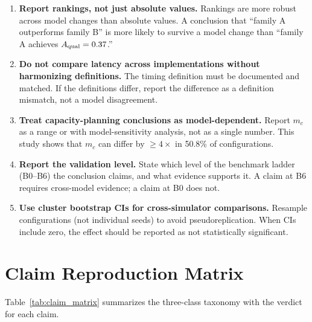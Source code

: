 \documentclass{ams-journal}
\newcommand{\Aqual}{A_{\rm qual}}
\begin{document}
\begin{enumerate}[leftmargin=2em]
\item \textbf{Report rankings, not just absolute values.} Rankings are more robust across model changes than absolute values. A conclusion that ``family A outperforms family B'' is more likely to survive a model change than ``family A achieves $\Aqual = 0.37$.''

\item \textbf{Do not compare latency across implementations without harmonizing definitions.} The timing definition must be documented and matched. If the definitions differ, report the difference as a definition mismatch, not a model disagreement.

\item \textbf{Treat capacity-planning conclusions as model-dependent.} Report $m_c$ as a range or with model-sensitivity analysis, not as a single number. This study shows that $m_c$ can differ by $\geq 4\times$ in 50.8\% of configurations.

\item \textbf{Report the validation level.} State which level of the benchmark ladder (B0--B6) the conclusion claims, and what evidence supports it. A claim at B6 requires cross-model evidence; a claim at B0 does not.

\item \textbf{Use cluster bootstrap CIs for cross-simulator comparisons.} Resample configurations (not individual seeds) to avoid pseudoreplication. When CIs include zero, the effect should be reported as not statistically significant.
\end{enumerate}

\section{Claim Reproduction Matrix}
\label{sec:claim_matrix}

Table~\ref{tab:claim_matrix} summarizes the three-class taxonomy with the verdict for each claim.
\end{document}
